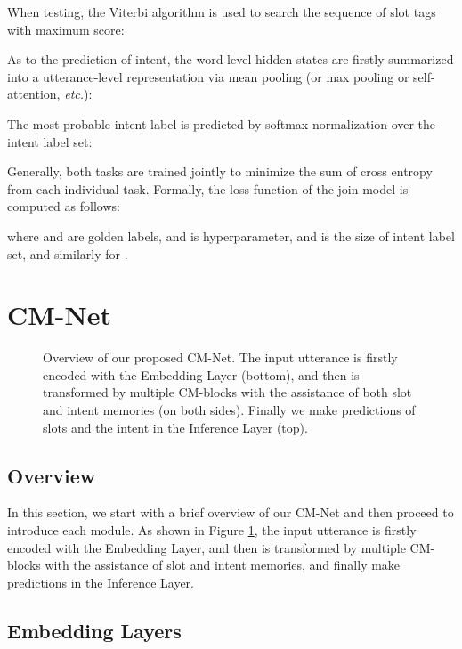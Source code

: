 \documentclass[11pt,a4paper]{article}
\begin{document}
When testing, the Viterbi algorithm \cite{viterbi} is used to search the sequence of slot tags with maximum score:

As to the prediction of intent, the word-level hidden states  are firstly summarized into a utterance-level representation  via mean pooling (or max pooling or self-attention, {\em etc.}):

The most probable intent label  is predicted by softmax normalization over the intent label set:


Generally, both tasks are trained jointly to minimize the sum of cross entropy from each individual task. Formally, the loss function of the join model is computed as follows:

where  and  are golden labels,
and  is hyperparameter,
and  is the size of intent label set,
and similarly for  .



\section{CM-Net}
\begin{figure}[t!]
\begin{center}
      \vspace{-19pt}
      \caption{Overview of our proposed CM-Net.
      The input utterance is firstly encoded with the Embedding Layer (bottom), and then is transformed by multiple CM-blocks with the assistance of both slot and intent memories (on both sides). Finally we make predictions of slots and the intent in the Inference Layer (top).
      }\vspace{-10pt}
      \label{overview}  
 \end{center}
\end{figure}

\subsection{Overview}
In this section, we start with a brief overview of our CM-Net and then proceed to introduce each module. As shown in Figure \ref{overview}, the input utterance is firstly encoded with the Embedding Layer, and then is transformed by multiple CM-blocks with the assistance of slot and intent memories, and finally make predictions in the Inference Layer.

\subsection{Embedding Layers}
\end{document}
